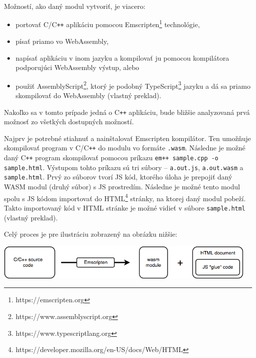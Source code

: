 Možností, ako daný modul vytvoriť, je viacero:
\begin {itemize}
\item {portovať C/C\texttt{++} aplikáciu pomocou Emscripten\footnote{https://emscripten.org} technológie,}
\item {písať priamo vo WebAssembly,}
\item {napísať aplikáciu v inom jazyku a kompilovať ju pomocou kompilátora podporujúci WebAssembly výstup, alebo}
\item {použiť AssemblyScript\footnote{https://www.assemblyscript.org}, ktorý je podobný TypeScript\footnote{https://www.typescriptlang.org} jazyku a dá sa priamo skompilovať do WebAssembly \cite{webassembly_concepts} (vlastný preklad).}
\end {itemize}

Nakoľko sa v tomto prípade jedná o C\texttt{++} aplikáciu, bude bližšie analyzovaná prvá možnosť zo všetkých dostupných možností.

Najprv je potrebné stiahnuť a nainštalovať Emscripten kompilátor. Ten umožňuje skompilovať program v C/C\texttt{++} do modulu vo formáte \texttt{.wasm}. Následne je možné daný C\texttt{++} program skompilovať pomocou príkazu \newline \texttt{em++ sample.cpp -o sample.html}. Výstupom tohto príkazu sú tri súbory -- \newline \texttt{a.out.js}, \texttt{a.out.wasm} a \texttt{sample.html}. Prvý zo súborov tvorí JS kód, ktorého úloha je prepojiť daný WASM modul (druhý súbor) s JS prostredím. Následne je možné tento modul spolu s JS kódom importovať do HTML\footnote{https://developer.mozilla.org/en-US/docs/Web/HTML} stránky, na ktorej daný modul pobeží. Takto importovaný kód v HTML stránke je možné vidieť v súbore \texttt{sample.html} \cite{cpp_to_wasm} (vlastný preklad).

Celý proces je pre ilustráciu zobrazený na obrázku nižšie:
\begin {center}
        \centering
        \includegraphics[height=1.75cm]{media/graphs/cpp_to_wasm.png}
        \captionsetup{justification=centering}
\end {center}

\clearpage

